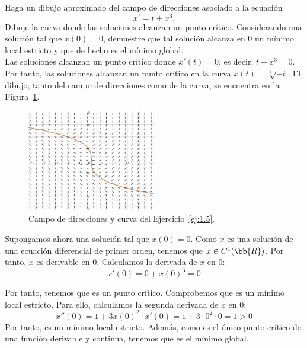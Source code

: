 \begin{ejercicio} \label{ej:1.5}
    Haga un dibujo aproximado del campo de direcciones asociado a la ecuación
    \begin{equation*}
        x' = t + x^3.
    \end{equation*}
    Dibuje la curva donde las soluciones alcanzan un punto crítico. Considerando una solución tal que \(x(0) = 0\), demuestre que tal solución alcanza en 0 un mínimo local estricto y que de hecho es el mínimo global.\\

    Las soluciones alcanzan un punto crítico donde $x'(t)=0$, es decir, $t+x^3=0$. Por tanto, las soluciones alcanzan un punto crítico en la curva $x(t)=\sqrt[3]{-t}$.
    El dibujo, tanto del campo de direcciones como de la curva, se encuentra en la Figura~\ref{fig:ej1.5}.
    \begin{figure}[H]
        \centering
        \includegraphics[width=0.5\textwidth]{Imagenes/Rel1_Ej5.png}
        \caption{Campo de direcciones y curva del Ejercicio~\ref{ej:1.5}.}
        \label{fig:ej1.5}
    \end{figure}

    Supongamos ahora una solución tal que $x(0)=0$. Como $x$ es una solución de una ecuación diferencial de primer orden, tenemos que $x\in C^1(\bb{R})$. Por tanto, $x$ es derivable en $0$. Calculamos la derivada de $x$ en $0$:
    \begin{equation*}
        x'(0) = 0 + x(0)^3 = 0
    \end{equation*}

    Por tanto, tenemos que es un punto crítico. Comprobemos que es un mínimo local estricto. Para ello, calculamos la segunda derivada de $x$ en $0$:
    \begin{equation*}
        x''(0) = 1 + 3x(0)^2\cdot x'(0) = 1 + 3\cdot 0^2\cdot 0 = 1 > 0
    \end{equation*}
    Por tanto, es un mínimo local estricto. Además, como es el único punto crítico de una función derivable y continua, tenemos que es el mínimo global.
\end{ejercicio}


